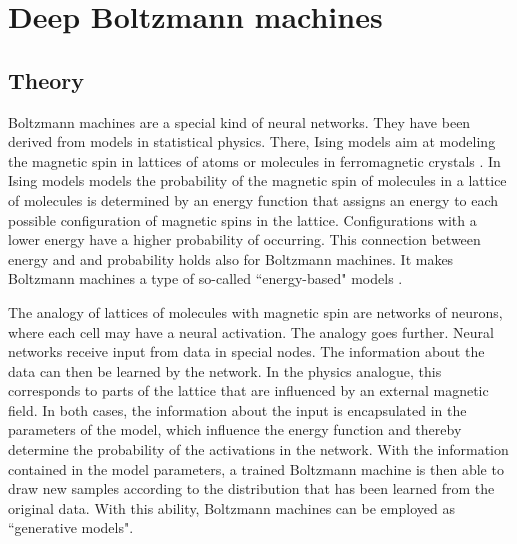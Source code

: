 \documentclass[12pt]{article}
\begin{document}


\clearpage
\section{Deep Boltzmann machines}
\subsection{Theory}

Boltzmann machines \citep{ackley_boltzmann_1985} are a special kind of neural networks.
They have been derived from models in statistical physics.
There, Ising models aim at modeling the magnetic spin in lattices of atoms or molecules in ferromagnetic crystals \citep{isingmodel}.
In Ising models models the probability of the magnetic spin of molecules in a lattice of molecules is determined by an energy function that assigns an energy to each possible configuration of magnetic spins in the lattice.
Configurations with a lower energy have a higher probability of occurring.
This connection between energy and and probability holds also for Boltzmann machines.
It makes Boltzmann machines a type of so-called ``energy-based" models \citep{ranzato_ebm}.

The analogy of lattices of molecules with magnetic spin are networks of neurons, where each cell may have a neural activation.
The analogy goes further.
Neural networks receive input from data in special nodes.
The information about the data can then be learned by the network.
In the physics analogue, this corresponds to parts of the lattice that are influenced by an external magnetic field.
In both cases, the information about the input is encapsulated in the parameters of the model, which influence the energy function and thereby determine the probability of the activations in the network.
With the information contained in the model parameters, a trained Boltzmann machine is then able to draw new samples according to the distribution that has been learned from the original data.
With this ability, Boltzmann machines can be employed as ``generative models".
\end{document}
